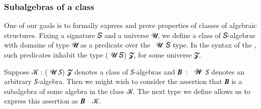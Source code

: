 \subsubsection{Subalgebras of a class}\label{subalgebras-of-a-class}

One of our goals is to formally express and prove properties of classes of algebraic structures.  Fixing a signature \ab 𝑆 and a universe \ab 𝓤, we define a class of \ab 𝑆-algebras with domains of type \ab 𝓤\af ̇ as a predicate over the ~\ab 𝓤~\ab 𝑆 type. In the syntax of the \ualib, such predicates inhabit the type  ( \ab 𝓤 \ab 𝑆) \ab 𝓩, for some universe \ab 𝓩.

Suppose \ab 𝒦 \as :  ( \ab 𝓤 \ab 𝑆) \ab 𝓩 denotes a class of \ab 𝑆-algebras and 
\ab 𝑩~\as :~~\ab 𝓦~\ab 𝑆 denotes an arbitrary \ab 𝑆-algebra. Then we might wish to consider the assertion that \ab 𝑩 is a subalgebra of some algebra in the class \ab 𝒦.  The next type we define allows us to express this assertion as \ab 𝑩~~\ab 𝒦.
\ccpad
\begin{code}%
\>[1]\AgdaSpace{}%
\AgdaSymbol{:}\AgdaSpace{}%
\AgdaSpace{}%
\AgdaSpace{}%
\AgdaSpace{}%
\AgdaSpace{}%
\AgdaSpace{}%
\AgdaSymbol{(}\AgdaSpace{}%
\AgdaSpace{}%
\AgdaSymbol{)}\AgdaSpace{}%
\AgdaSpace{}%
\AgdaSpace{}%
\AgdaSpace{}%
\AgdaSymbol{(}\AgdaSpace{}%
\AgdaSpace{}%
\AgdaSymbol{)}\AgdaSpace{}%
\AgdaSpace{}%
\AgdaSpace{}%
\<%
\\
%
\>[1]\AgdaSpace{}%
\AgdaSpace{}%
\AgdaSpace{}%
\AgdaSymbol{=}\AgdaSpace{}%
\AgdaSpace{}%
\AgdaSpace{}%
\AgdaSpace{}%
\AgdaSpace{}%
\AgdaSpace{}%
\AgdaSpace{}%
\AgdaFunction{,}\AgdaSpace{}%
\AgdaSpace{}%
\AgdaSpace{}%
%
\>[380I]\AgdaSymbol{\{}\AgdaSymbol{\}}\AgdaSpace{}%
\AgdaSpace{}%
\AgdaFunction{,}\AgdaSpace{}%
\AgdaSymbol{(}\AgdaSpace{}%
\AgdaSpace{}%
\AgdaSymbol{)}%
\>[68]\AgdaSpace{}%
\AgdaSymbol{(}\AgdaSpace{}%
\AgdaSpace{}%
\AgdaSpace{}%
\AgdaSpace{}%
\AgdaSymbol{)}\<%
\end{code}
